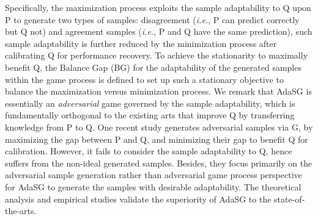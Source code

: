 Specifically, the maximization process exploits the sample adaptability to Q upon P to generate two types of samples: disagreement (\emph{i.e.}, P can predict correctly but Q not) and agreement samples (\emph{i.e.}, P and Q have the same prediction), such sample adaptability is further reduced by the minimization process after calibrating Q for performance recovery. To achieve the stationarity to maximally benefit Q,
the Balance Gap (BG) for the adaptability of the generated samples within the game process is defined to set up such a stationary objective to balance the maximization versus minimization process.
We remark that AdaSG is essentially an \emph{adversarial} game governed by the sample adaptability, which is fundamentally orthogonal to the existing arts that improve Q by transferring knowledge from P to Q.
One recent study \cite{liu2021zero} generates adversarial samples via G, by maximizing the gap between P and Q, and minimizing their gap to benefit Q for calibration.  However, it fails to consider the sample adaptability to Q, hence suffers from the non-ideal generated samples. Besides, they focus primarily on the adversarial sample generation rather than adversarial game process perspective for AdaSG to generate the samples with desirable adaptability.
The theoretical analysis and empirical studies validate the superiority of AdaSG to the state-of-the-arts.










